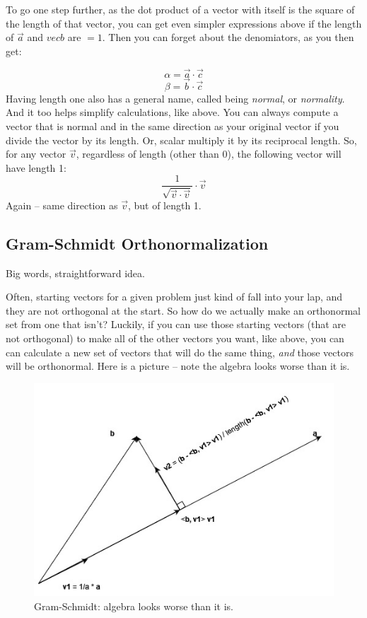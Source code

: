 \documentclass[
]{book}
\begin{document}
To go one step further, as the dot product of a vector with itself is the square of the length of that vector, you can get even simpler expressions above if the length of \(\vec{a}\) and \(vec{b}\) are \(= 1\). Then you can forget about the denomiators, as you then get:

\[\alpha = \vec{a}\cdot\vec{c}\]
\[\beta = \vec{b}\cdot\vec{c}\]
Having length one also has a general name, called being \emph{normal}, or \emph{normality}. And it too helps simplify calculations, like above. You can always compute a vector that is normal and in the same direction as your original vector if you divide the vector by its length. Or, scalar multiply it by its reciprocal length. So, for any vector \(\vec{v}\), regardless of length (other than 0), the following vector will have length 1:
\[\frac{1}{\sqrt{\vec{v}\cdot\vec{v}}}\cdot\vec{v}\]
Again -- same direction as \(\vec{v}\), but of length 1.

\hypertarget{gram-schmidt-orthonormalization}{%
\subsection{Gram-Schmidt Orthonormalization}\label{gram-schmidt-orthonormalization}}

Big words, straightforward idea.

Often, starting vectors for a given problem just kind of fall into your lap, and they are not orthogonal at the start. So how do we actually make an orthonormal set from one that isn't? Luckily, if you can use those starting vectors (that are not orthogonal) to make all of the other vectors you want, like above, you can can calculate a new set of vectors that will do the same thing, \emph{and} those vectors will be orthonormal. Here is a picture -- note the algebra looks worse than it is.

\begin{figure}

{\centering \includegraphics[width=0.75\linewidth,height=0.75\textheight]{images/gram-schmidt} 

}

\caption{Gram-Schmidt: algebra looks worse than it is.}\label{fig:unnamed-chunk-3}
\end{figure}
\end{document}
